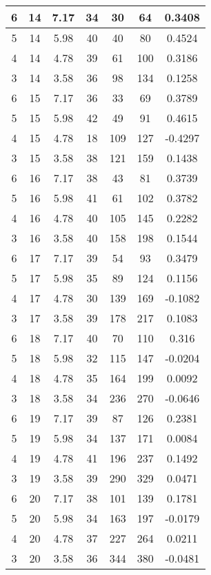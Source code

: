 \documentclass[letterpaper, 12pt]{article}
\begin{document}
\begin{longtable}{|c|c|c|c|c|c|c|}
\hline
6 & 14 & 7.17 & 34 & 30 & 64 & 0.3408 \\
\hline
5 & 14 & 5.98 & 40 & 40 & 80 & 0.4524 \\
\hline
4 & 14 & 4.78 & 39 & 61 & 100 & 0.3186 \\
\hline
3 & 14 & 3.58 & 36 & 98 & 134 & 0.1258 \\
\hline
6 & 15 & 7.17 & 36 & 33 & 69 & 0.3789 \\
\hline
5 & 15 & 5.98 & 42 & 49 & 91 & 0.4615 \\
\hline
4 & 15 & 4.78 & 18 & 109 & 127 & -0.4297 \\
\hline
3 & 15 & 3.58 & 38 & 121 & 159 & 0.1438 \\
\hline
6 & 16 & 7.17 & 38 & 43 & 81 & 0.3739 \\
\hline
5 & 16 & 5.98 & 41 & 61 & 102 & 0.3782 \\
\hline
4 & 16 & 4.78 & 40 & 105 & 145 & 0.2282 \\
\hline
3 & 16 & 3.58 & 40 & 158 & 198 & 0.1544 \\
\hline
6 & 17 & 7.17 & 39 & 54 & 93 & 0.3479 \\
\hline
5 & 17 & 5.98 & 35 & 89 & 124 & 0.1156 \\
\hline
4 & 17 & 4.78 & 30 & 139 & 169 & -0.1082 \\
\hline
3 & 17 & 3.58 & 39 & 178 & 217 & 0.1083 \\
\hline
6 & 18 & 7.17 & 40 & 70 & 110 & 0.316 \\
\hline
5 & 18 & 5.98 & 32 & 115 & 147 & -0.0204 \\
\hline
4 & 18 & 4.78 & 35 & 164 & 199 & 0.0092 \\
\hline
3 & 18 & 3.58 & 34 & 236 & 270 & -0.0646 \\
\hline
6 & 19 & 7.17 & 39 & 87 & 126 & 0.2381 \\
\hline
5 & 19 & 5.98 & 34 & 137 & 171 & 0.0084 \\
\hline
4 & 19 & 4.78 & 41 & 196 & 237 & 0.1492 \\
\hline
3 & 19 & 3.58 & 39 & 290 & 329 & 0.0471 \\
\hline
6 & 20 & 7.17 & 38 & 101 & 139 & 0.1781 \\
\hline
5 & 20 & 5.98 & 34 & 163 & 197 & -0.0179 \\
\hline
4 & 20 & 4.78 & 37 & 227 & 264 & 0.0211 \\
\hline
3 & 20 & 3.58 & 36 & 344 & 380 & -0.0481 \\
\hline
\end{longtable}
\end{document}
